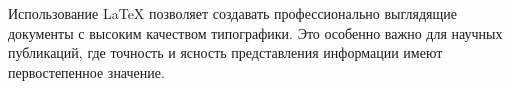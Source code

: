 \documentclass{article}
\begin{document}
Использование \LaTeX{} позволяет создавать профессионально выглядящие документы с высоким качеством типографики. Это особенно важно для научных публикаций, где точность и ясность представления информации имеют первостепенное значение.

\end{document}
